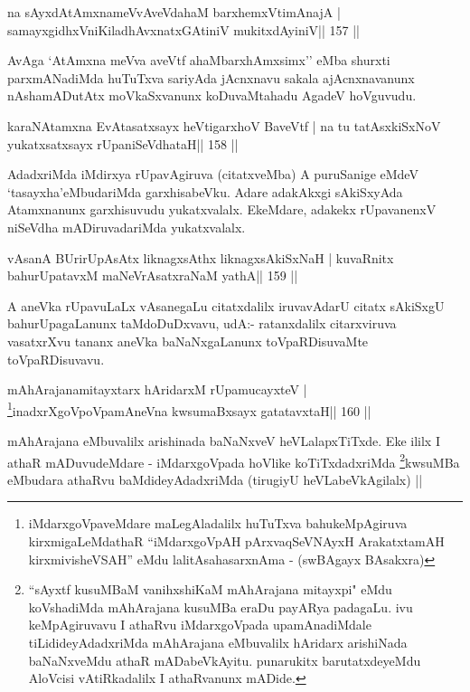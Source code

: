 \begin{shl}
na sAyxdAtAmxnameVvAveVdahaM barxhemxVtimAnajA |
samayxgidhxVniKiladhAvxnatxGAtiniV mukitxdAyiniV\hfill || 157 ||
\end{shl}

\begin{artha}
AvAga `AtAmxna meVva aveVtf ahaMbarxhAmxsimx'' eMba shurxti parxmANadiMda huTuTxva sariyAda jAcnxnavu sakala ajAcnxnavanunx nAshamADutAtx moVkaSxvanunx koDuvaMtahadu AgadeV hoVguvudu.
\end{artha}

\begin{shl}
karaNAtamxna EvAtasatxsayx heVtigarxhoV BaveVtf |
na tu tatAsxkiSxNoV yukatxsatxsayx rUpaniSeVdhataH\hfill || 158 ||
\end{shl}

\begin{artha}
AdadxriMda iMdirxya rUpavAgiruva (citatxveMba) A puruSanige eMdeV `tasayxha'eMbudariMda garxhisabeVku. Adare adakAkxgi sAkiSxyAda Atamxnanunx garxhisuvudu yukatxvalalx. EkeMdare, adakekx rUpavanenxV niSeVdha mADiruvadariMda yukatxvalalx.
\end{artha}


\begin{shl}
vAsanA BUrirUpAsAtx liknagxsAthx liknagxsAkiSxNaH |
kuvaRnitx bahurUpatavxM maNeVrAsatxraNaM yathA\hfill || 159 ||
\end{shl}

\begin{artha}
A aneVka rUpavuLaLx vAsanegaLu citatxdalilx iruvavAdarU citatx sAkiSxgU bahurUpagaLanunx taMdoDuDxvavu, udA:- ratanxdalilx citarxviruva vasatxrXvu tananx aneVka baNaNxgaLanunx toVpaRDisuvaMte toVpaRDisuvavu.
\end{artha}

\begin{shl}
mAhArajanamitayxtarx hAridarxM rUpamucayxteV |
\footnote{iMdarxgoVpaveMdare maLegAladalilx huTuTxva
  bahukeMpAgiruva kirxmigaLeMdathaR ``iMdarxgoVpAH pArxvaqSeVNAyxH
  ArakatxtamAH kirxmivisheVSAH'' eMdu lalitAsahasarxnAma - (swBAgayx BAsakxra)}inadxrXgoVpoVpamAneVna kwsumaBxsayx gatatavxtaH\hfill || 160 ||
\end{shl}

\begin{artha}
mAhArajana eMbuvalilx arishinada baNaNxveV heVLalapxTiTxde. Eke ililx
I athaR mADuvudeMdare - iMdarxgoVpada hoVlike
koTiTxdadxriMda \footnote{``sAyxtf kusuMBaM vanihxshiKaM mAhArajana
mitayxpi" eMdu koVshadiMda mAhArajana kusuMBa eraDu payARya
padagaLu. ivu keMpAgiruvavu I athaRvu iMdarxgoVpada upamAnadiMdale
tiLidideyAdadxriMda mAhArajana eMbuvalilx hAridarx arishiNada
baNaNxveMdu athaR mADabeVkAyitu. punarukitx barutatxdeyeMdu AloVcisi
vAtiRkadalilx I athaRvanunx mADide.}kwsuMBa eMbudara athaRvu
baMdideyAdadxriMda (tirugiyU heVLabeVkAgilalx) ||
\end{artha}

